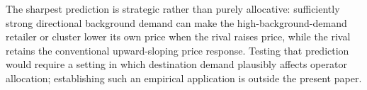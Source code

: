The sharpest prediction is strategic rather than purely allocative: sufficiently strong directional background demand can make the high-background-demand retailer or cluster lower its own price when the rival raises price, while the rival retains the conventional upward-sloping price response. Testing that prediction would require a setting in which destination demand plausibly affects operator allocation; establishing such an empirical application is outside the present paper.
